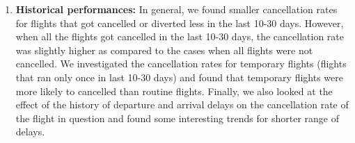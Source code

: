 \documentclass[12pt]{article}
\begin{document}
\begin{enumerate}
\item \textbf{Historical performances:}  In general, we found smaller cancellation rates for flights that got cancelled or diverted less in the last 10-30 days. However, when all the flights got cancelled in the last 10-30 days, the cancellation rate was slightly higher as compared to the cases when all flights were not cancelled. We investigated the cancellation rates for temporary flights (flights that ran only once in last 10-30 days) and found that temporary flights were more likely to cancelled than routine flights. Finally, we also looked at the effect of the history of departure and arrival delays on the cancellation rate of the flight in question and found some interesting trends for shorter range of delays. 
\end{enumerate}
\end{document}
